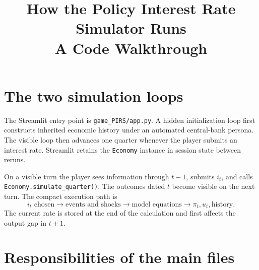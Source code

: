 \documentclass[11pt]{article}
\title{How the Policy Interest Rate Simulator Runs\\\large A Code Walkthrough}
\author{}
\date{}
\newcommand{\code}[1]{\texttt{#1}}
\newcommand{\file}[1]{\texttt{game\_PIRS/#1}}
\begin{document}
\maketitle

\section{The two simulation loops}

The Streamlit entry point is \file{app.py}.  A hidden initialization loop first
constructs inherited economic history under an automated central-bank persona.
The visible loop then advances one quarter whenever the player submits an
interest rate.  Streamlit retains the \code{Economy} instance in session state
between reruns.

On a visible turn the player sees information through $t-1$, submits $i_t$, and
calls \code{Economy.simulate\_quarter()}.  The outcomes dated $t$ become visible
on the next turn.  The compact execution path is
\[
 \boxed{i_t\text{ chosen}}
 \longrightarrow\boxed{\text{events and shocks}}
 \longrightarrow\boxed{\text{model equations}}
 \longrightarrow\boxed{\pi_t,u_t,\text{history}}.
\]
The current rate is stored at the end of the calculation and first affects the
output gap in $t+1$.

\section{Responsibilities of the main files}
\end{document}
